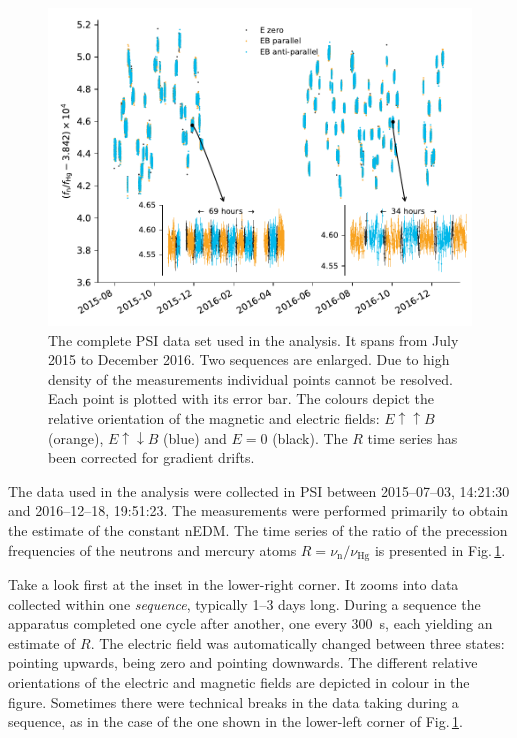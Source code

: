 
\begin{figure}
  \centering
  \includegraphics[width=0.9\linewidth]{gfx/axions/deltah4mm_time_domain_inset_no_yerr.pdf}
  \caption{The complete PSI data set used in the analysis. It spans from July 2015 to December 2016. Two sequences are enlarged. Due to high density of the measurements individual points cannot be resolved. Each point is plotted with its error bar. The colours depict the relative orientation of the magnetic and electric fields: $E \uparrow \uparrow B$ (orange), $E \uparrow \downarrow B$ (blue) and $E=0$ (black). The $R$ time series has been corrected for gradient drifts.}
  \label{fig:PSI_dataset_time_domain}
\end{figure}

The data used in the analysis were collected in PSI between 2015--07--03, 14:21:30 and 2016--12--18, 19:51:23. The measurements were performed primarily to obtain the estimate of the constant nEDM\@. The time series of the ratio of the precession frequencies of the neutrons and mercury atoms $R = \nu_\text{n} / \nu_\text{Hg}$ is presented in Fig.\,\ref{fig:PSI_dataset_time_domain}.

Take a look first at the inset in the lower-right corner. It zooms into data collected within one \emph{sequence}, typically 1--3 days long.
During a sequence the apparatus completed one cycle after another, one every \SI{300}{\second}, each yielding an estimate of $R$.
The electric field was automatically changed between three states: pointing upwards, being zero and pointing downwards. The different relative orientations of the electric and magnetic fields are depicted in colour in the figure. Sometimes there were technical breaks in the data taking during a sequence, as in the case of the one shown in the lower-left corner of Fig.\,\ref{fig:PSI_dataset_time_domain}.

